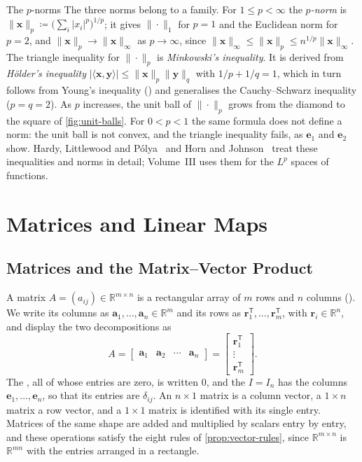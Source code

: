 \begin{note}{The \texorpdfstring{$p$}{p}-norms}
The three norms belong to a family. For $1\le p<\infty$ the \emph{$p$-norm} is $\|\mathbf x\|_p\coloneqq\bigl(\sum_i|x_i|^p\bigr)^{1/p}$; it gives $\|\cdot\|_1$ for $p=1$ and the Euclidean norm for $p=2$, and $\|\mathbf x\|_p\to\|\mathbf x\|_\infty$ as $p\to\infty$, since $\|\mathbf x\|_\infty\le\|\mathbf x\|_p\le n^{1/p}\|\mathbf x\|_\infty$. The triangle inequality for $\|\cdot\|_p$ is \emph{Minkowski's inequality}. It is derived from \emph{H\"older's inequality} $|\langle\mathbf x,\mathbf y\rangle|\le\|\mathbf x\|_p\|\mathbf y\|_q$ with $1/p+1/q=1$, which in turn follows from Young's inequality () and generalises the Cauchy--Schwarz inequality ($p=q=2$). As $p$ increases, the unit ball of $\|\cdot\|_p$ grows from the diamond to the square of \cref{fig:unit-balls}. For $0<p<1$ the same formula does not define a norm: the unit ball is not convex, and the triangle inequality fails, as $\mathbf e_1$ and $\mathbf e_2$ show. Hardy, Littlewood and P\'olya~\cite{hardy1952inequalities} and Horn and Johnson~\cite[Chap.~5]{horn2013} treat these inequalities and norms in detail; Volume~III uses them for the $L^p$ spaces of functions.
\end{note}

\section{Matrices and Linear Maps}
\label{sec:matrices-linear-maps}

\subsection{Matrices and the Matrix--Vector Product}

A matrix $A=(a_{ij})\in\mathbb R^{m\times n}$ is a rectangular array of $m$ rows and $n$ columns (). We write its columns as $\mathbf a_1,\ldots,\mathbf a_n\in\mathbb R^m$ and its rows as $\mathbf r_1^{\mathsf T},\ldots,\mathbf r_m^{\mathsf T}$, with $\mathbf r_i\in\mathbb R^n$, and display the two decompositions as
\[
A=\begin{bmatrix}\mathbf a_1&\mathbf a_2&\cdots&\mathbf a_n\end{bmatrix}=\begin{bmatrix}\mathbf r_1^{\mathsf T}\\\vdots\\\mathbf r_m^{\mathsf T}\end{bmatrix}.
\]
The , all of whose entries are zero, is written $0$, and the  $I=I_n$ has the columns $\mathbf e_1,\ldots,\mathbf e_n$, so that its entries are $\delta_{ij}$. An $n\times1$ matrix is a column vector, a $1\times n$ matrix a row vector, and a $1\times1$ matrix is identified with its single entry. Matrices of the same shape are added and multiplied by scalars entry by entry, and these operations satisfy the eight rules of \cref{prop:vector-rules}, since $\mathbb R^{m\times n}$ is $\mathbb R^{mn}$ with the entries arranged in a rectangle.

